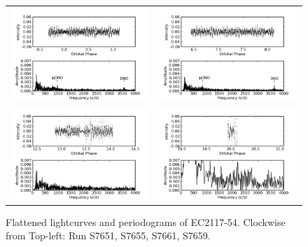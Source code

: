 \begin{figure}[t]
\begin{narrow}{-0.75	in}{0in}
\begin{tabular}{lr}
 \includegraphics[width = 0.6\columnwidth, bb=0 0 600 400]{images/august_phot/S7651/S7651.png} & 
 \includegraphics[width = 0.6\columnwidth, bb=0 0 600 400]{images/august_phot/S7655/S7655.png}  \\
 \includegraphics[width = 0.6\columnwidth, bb=0 0 600 400]{images/august_phot/S7659/S7659.png} &
 \includegraphics[width = 0.6\columnwidth, bb=0 0 600 400]{images/august_phot/S7661/S7661.png}
\end{tabular}
\end{narrow}
\caption[Flattened lightcurves and periodograms of EC2117-54.]{Flattened lightcurves and periodograms 
of EC2117-54. Clockwise from Top-left: Run S7651, S7655, S7661, S7659.} 
\label{ec2117_zcha}

\end{figure}


